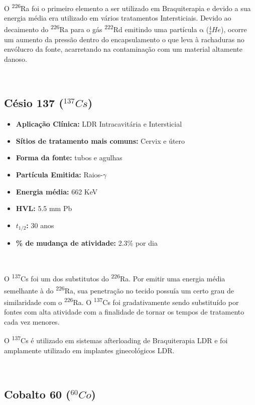 \documentclass[11pt,a4paper]{article}
\begin{document}
			\

			O \textsuperscript{226}Ra foi o primeiro elemento a ser utilizado em Braquiterapia e devido a sua energia média era utilizado em vários tratamentos Intersticiais. Devido ao decaimento do \textsuperscript{226}Ra para o gás \textsuperscript{222}Rd emitindo uma partícula $\mathrm{\alpha}$ (${}_2^4He$), ocorre um aumento da pressão dentro do encapsulamento o que leva à rachaduras no envólucro da fonte, acarretando na contaminação com um material altamente danoso.

			\
		
		\subsection{Césio 137 \textbf{\textcolor{CarnationPink}{(${}^{137}Cs$)}}}

			\begin{itemize}
				\item \textbf{Aplicação Clínica:} LDR Intracavitária e Intersticial
				\item \textbf{Sítios de tratamento mais comuns:} Cervix e útero
				\item \textbf{Forma da fonte:} tubos e agulhas
				\item \textbf{Partícula Emitida:} Raios-$\gamma$
				\item \textbf{Energia média: } 662 KeV
				\item \textbf{HVL:} 5.5 mm Pb
				\item \textbf{$t_{1/2}$:} 30 anos
				\item \textbf{\% de mudança de atividade: } 2.3\% por dia
			\end{itemize}

			\

			O \textsuperscript{137}Cs foi um dos substitutos do \textsuperscript{226}Ra. Por emitir uma energia média semelhante à do \textsuperscript{226}Ra, sua penetração no tecido possuía um certo grau de similaridade com o \textsuperscript{226}Ra. O \textsuperscript{137}Cs foi gradativamente sendo substituído por fontes com alta atividade com a finalidade de tornar os tempos de tratamento cada vez menores.

			O \textsuperscript{137}Cs é utilizado em sistemas afterloading de Braquiterapia LDR e foi amplamente utilizado em implantes ginecológicos LDR.

			\

		\subsection{Cobalto 60 \textbf{\textcolor{CarnationPink}{(${}^{60}Co$)}}}
		
\end{document}
